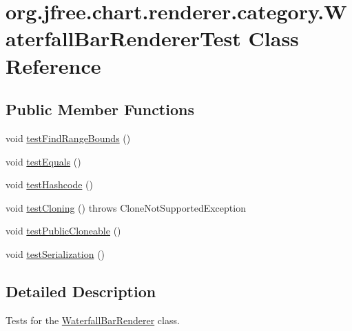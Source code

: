 \hypertarget{classorg_1_1jfree_1_1chart_1_1renderer_1_1category_1_1_waterfall_bar_renderer_test}{}\section{org.\+jfree.\+chart.\+renderer.\+category.\+Waterfall\+Bar\+Renderer\+Test Class Reference}
\label{classorg_1_1jfree_1_1chart_1_1renderer_1_1category_1_1_waterfall_bar_renderer_test}
\subsection*{Public Member Functions}
\begin{DoxyCompactItemize}
\item 
void \mbox{\hyperlink{classorg_1_1jfree_1_1chart_1_1renderer_1_1category_1_1_waterfall_bar_renderer_test_a0ca8be951e65cd9ae47bb3bd2d51ef13}{test\+Find\+Range\+Bounds}} ()
\item 
void \mbox{\hyperlink{classorg_1_1jfree_1_1chart_1_1renderer_1_1category_1_1_waterfall_bar_renderer_test_ae82b127a2e9cfcfb66b0a0dd8c958f9f}{test\+Equals}} ()
\item 
void \mbox{\hyperlink{classorg_1_1jfree_1_1chart_1_1renderer_1_1category_1_1_waterfall_bar_renderer_test_ad56b8a56fbb6e65548699847f7f8fb5b}{test\+Hashcode}} ()
\item 
void \mbox{\hyperlink{classorg_1_1jfree_1_1chart_1_1renderer_1_1category_1_1_waterfall_bar_renderer_test_a9506421ef9f472ae13f32793f28b62c7}{test\+Cloning}} ()  throws Clone\+Not\+Supported\+Exception 
\item 
void \mbox{\hyperlink{classorg_1_1jfree_1_1chart_1_1renderer_1_1category_1_1_waterfall_bar_renderer_test_abba4d74b05171d65811bed4438526731}{test\+Public\+Cloneable}} ()
\item 
void \mbox{\hyperlink{classorg_1_1jfree_1_1chart_1_1renderer_1_1category_1_1_waterfall_bar_renderer_test_a9ded8fbc3102ea899e0f5a9fefad41fd}{test\+Serialization}} ()
\end{DoxyCompactItemize}


\subsection{Detailed Description}
Tests for the \mbox{\hyperlink{classorg_1_1jfree_1_1chart_1_1renderer_1_1category_1_1_waterfall_bar_renderer}{Waterfall\+Bar\+Renderer}} class. 

